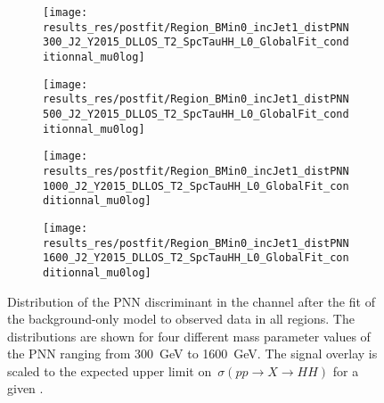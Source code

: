 \begin{figure}[htbp]
  \centering

  \begin{subfigure}{0.495\textwidth}
    \centering

    \texttt{[image: results\_res/postfit/Region\_BMin0\_incJet1\_distPNN300\_J2\_Y2015\_DLLOS\_T2\_SpcTauHH\_L0\_GlobalFit\_conditionnal\_mu0log]}
  \end{subfigure}\hfill%
  \begin{subfigure}{0.495\textwidth}
    \centering

    \texttt{[image: results\_res/postfit/Region\_BMin0\_incJet1\_distPNN500\_J2\_Y2015\_DLLOS\_T2\_SpcTauHH\_L0\_GlobalFit\_conditionnal\_mu0log]}
  \end{subfigure}

  \begin{subfigure}{0.495\textwidth}
    \centering

    \texttt{[image: results\_res/postfit/Region\_BMin0\_incJet1\_distPNN1000\_J2\_Y2015\_DLLOS\_T2\_SpcTauHH\_L0\_GlobalFit\_conditionnal\_mu0log]}
    \label{fig:pnn1000_postfit}
  \end{subfigure}\hfill%
  \begin{subfigure}{0.495\textwidth}
    \centering

    \texttt{[image: results\_res/postfit/Region\_BMin0\_incJet1\_distPNN1600\_J2\_Y2015\_DLLOS\_T2\_SpcTauHH\_L0\_GlobalFit\_conditionnal\_mu0log]}
  \end{subfigure}

  \caption{Distribution of the PNN discriminant in the \hadhad channel after the
    fit of the background-only model to observed data in all regions. The
    distributions are shown for four different mass parameter values of the PNN
    ranging from \SI{300}{\GeV} to \SI{1600}{\GeV}. The signal overlay is scaled
    to the expected upper limit on~$\sigma(pp \to X \to HH)$ for a given \mX.}%
  \label{fig:resonant_mva_postfit}
\end{figure}


\begin{table}[htbp]
  \centering

  \caption{Expected number of events per physics process in the \hadhad SR for
    signal-like bins of the PNN discriminant after a fit of the background-only
    fit model to observed data in all regions. The two most signal-like bins are
    shown for $\mX = \SI{300}{\GeV}$ and \SI{500}{\GeV}. $\dagger$:~Only the
    most signal-like bin is shown for $\mX = \SI{1000}{\GeV}$ and
    \SI{1600}{\GeV} (cf.~).}%
  \label{tab:yields_postfit_resonant}

  \resizebox{\textwidth}{!}{%

    
  }
\end{table}

